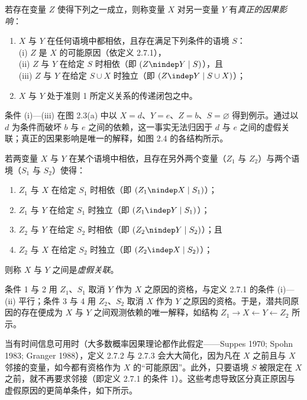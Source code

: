 \begin{definition}[真正原因]
若存在变量 $Z$ 使得下列之一成立，则称变量 $X$ 对另一变量 $Y$ 有\emph{真正的因果影响}：
\begin{enumerate}[label=\arabic*.,leftmargin=1.8em]
\item $X$ 与 $Y$ 在任何语境中都相依，且存在满足下列条件的语境 $S$：\\
(i) $Z$ 是 $X$ 的可能原因（依定义 2.7.1），\\
(ii) $Z$ 与 $Y$ 在给定 $S$ 时相依（即 $(Z\nindep Y\mid S)$），且\\
(iii) $Z$ 与 $Y$ 在给定 $S\cup X$ 时独立（即 $(Z\indep Y\mid S\cup X)$）；
\item $X$ 与 $Y$ 处于准则 1 所定义关系的传递闭包之中。
\end{enumerate}
\end{definition}

条件 (i)—(iii) 在图 2.3(a) 中以 $X=d$、$Y=e$、$Z=b$、$S=\varnothing$ 得到例示。通过以 $d$ 为条件而破坏 $b$ 与 $e$ 之间的依赖，这一事实无法归因于 $d$ 与 $e$ 之间的虚假关联；真正的因果影响是唯一的解释，如图 2.4 的各结构所示。

\begin{definition}[虚假关联]
若两变量 $X$ 与 $Y$ 在某个语境中相依，且存在另外两个变量（$Z_1$ 与 $Z_2$）与两个语境（$S_1$ 与 $S_2$）使得：
\begin{enumerate}[label=\arabic*.,leftmargin=1.8em]
\item $Z_1$ 与 $X$ 在给定 $S_1$ 时相依（即 $(Z_1\nindep X\mid S_1)$）；
\item $Z_1$ 与 $Y$ 在给定 $S_1$ 时独立（即 $(Z_1\indep Y\mid S_1)$）；
\item $Z_2$ 与 $Y$ 在给定 $S_2$ 时相依（即 $(Z_2\nindep Y\mid S_2)$）；且
\item $Z_2$ 与 $X$ 在给定 $S_2$ 时独立（即 $(Z_2\indep X\mid S_2)$）；
\end{enumerate}
则称 $X$ 与 $Y$ 之间是\emph{虚假关联}。
\end{definition}

条件 1 与 2 用 $Z_1$、$S_1$ 取消 $Y$ 作为 $X$ 之原因的资格，与定义 2.7.1 的条件 (i)—(ii) 平行；条件 3 与 4 用 $Z_2$、$S_2$ 取消 $X$ 作为 $Y$ 之原因的资格。于是，潜共同原因的存在便成为 $X$ 与 $Y$ 之间观测依赖的唯一解释，如结构 $Z_1\to X\leftarrow Y\leftarrow Z_2$ 所示。

当有时间信息可用时（大多数概率因果理论都作此假定——Suppes 1970; Spohn 1983; Granger 1988），定义 2.7.2 与 2.7.3 会大大简化，因为凡在 $X$ 之前且与 $X$ 邻接的变量，如今都有资格作为 $X$ 的“可能原因”。此外，只要语境 $S$ 被限定在 $X$ 之前，就不再要求邻接（即定义 2.7.1 的条件 1）。这些考虑导致区分真正原因与虚假原因的更简单条件，如下所示。

